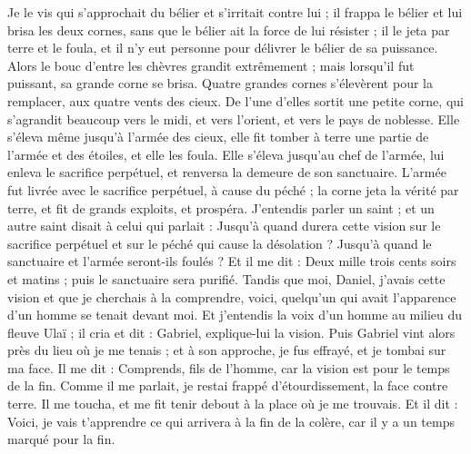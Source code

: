 \begin{multicols}{2}
Je le vis qui s’approchait du bélier et s'irritait contre lui ; il frappa le bélier et lui brisa les deux cornes, sans que le bélier ait la force de lui résister ; il le jeta par terre et le foula, et il n’y eut personne pour délivrer le bélier de sa puissance.
Alors le bouc d'entre les chèvres grandit extrêmement ; mais lorsqu’il fut puissant, sa grande corne se brisa. Quatre grandes cornes s’élevèrent pour la remplacer, aux quatre vents des cieux.
De l'une d'elles sortit une petite corne, qui s'agrandit beaucoup vers le midi, et vers l'orient, et vers le pays de noblesse.
Elle s’éleva même jusqu'à l'armée des cieux, elle fit tomber à terre une partie de l'armée et des étoiles, et elle les foula.
Elle s’éleva jusqu'au chef de l'armée, lui enleva le sacrifice perpétuel, et renversa la demeure de son sanctuaire.
L’armée fut livrée avec le sacrifice perpétuel, à cause du péché ; la corne jeta la vérité par terre, et fit de grands exploits, et prospéra.
J’entendis parler un saint ; et un autre saint disait à celui qui parlait : Jusqu'à quand durera cette vision sur  le sacrifice perpétuel et sur le péché qui cause la désolation ? Jusqu’à quand le sanctuaire et l'armée seront-ils foulés ?
Et il me dit : Deux mille trois cents soirs et matins ; puis le sanctuaire sera purifié.
Tandis que moi, Daniel, j’avais cette vision et que je cherchais à la comprendre, voici, quelqu’un qui avait l’apparence d'un homme se tenait devant moi.
Et j'entendis la voix d'un homme au milieu du fleuve Ulaï ; il cria et dit : Gabriel, explique-lui la vision.
Puis Gabriel vint alors près du lieu où je me tenais ; et à son approche, je fus effrayé, et je tombai sur ma face.  Il me dit : Comprends, fils de l’homme, car la vision est pour le temps de la fin.
Comme il me parlait, je restai frappé d’étourdissement, la face contre terre.  Il me toucha, et me fit tenir debout à la place où je me trouvais.
Et il dit : Voici, je vais t’apprendre ce qui arrivera à la fin de la colère, car il y a un temps marqué pour la fin.

\end{multicols}
